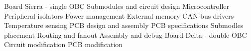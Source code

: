 
\chap Board Sierra - single OBC
\sec Submodules and circuit design
\secc Microcontroller
\secc Peripheral isolators
\secc Power management
\secc External memory
\secc CAN bus drivers
\secc Temperature sensing
\sec PCB design and assembly
\secc PCB specifications
\secc Submodles placement
\secc Routing and fanout
\secc Assembly and debug
\sec Board Delta - double OBC
\secc Circuit modification
\secc PCB modification
